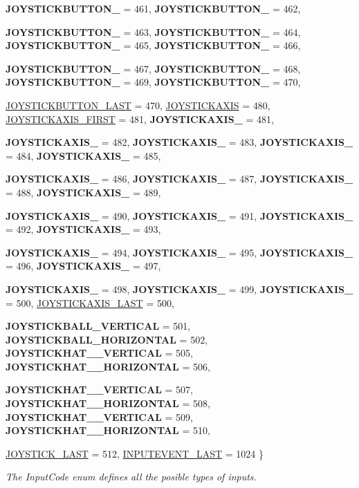\begin{DoxyCompactItemize}
{\bfseries JOYSTICKBUTTON\_} =  461, 
{\bfseries JOYSTICKBUTTON\_} =  462, 
\par
{\bfseries JOYSTICKBUTTON\_} =  463, 
{\bfseries JOYSTICKBUTTON\_} =  464, 
{\bfseries JOYSTICKBUTTON\_} =  465, 
{\bfseries JOYSTICKBUTTON\_} =  466, 
\par
{\bfseries JOYSTICKBUTTON\_} =  467, 
{\bfseries JOYSTICKBUTTON\_} =  468, 
{\bfseries JOYSTICKBUTTON\_} =  469, 
{\bfseries JOYSTICKBUTTON\_} =  470, 
\par
\hyperlink{classMezzanine_1_1MetaCode_a3b5633f0145bf3287cf53a3f05b5563ca7ea1e7f0467975d4d8165b3fd465c25d}{JOYSTICKBUTTON\_\-LAST} =  470, 
\hyperlink{classMezzanine_1_1MetaCode_a3b5633f0145bf3287cf53a3f05b5563ca01cf4d6112f9a220857513c6cfb8284e}{JOYSTICKAXIS} =  480, 
\hyperlink{classMezzanine_1_1MetaCode_a3b5633f0145bf3287cf53a3f05b5563ca5b234dac3606cc3158823d7162467efc}{JOYSTICKAXIS\_\-FIRST} =  481, 
{\bfseries JOYSTICKAXIS\_} =  481, 
\par
{\bfseries JOYSTICKAXIS\_} =  482, 
{\bfseries JOYSTICKAXIS\_} =  483, 
{\bfseries JOYSTICKAXIS\_} =  484, 
{\bfseries JOYSTICKAXIS\_} =  485, 
\par
{\bfseries JOYSTICKAXIS\_} =  486, 
{\bfseries JOYSTICKAXIS\_} =  487, 
{\bfseries JOYSTICKAXIS\_} =  488, 
{\bfseries JOYSTICKAXIS\_} =  489, 
\par
{\bfseries JOYSTICKAXIS\_} =  490, 
{\bfseries JOYSTICKAXIS\_} =  491, 
{\bfseries JOYSTICKAXIS\_} =  492, 
{\bfseries JOYSTICKAXIS\_} =  493, 
\par
{\bfseries JOYSTICKAXIS\_} =  494, 
{\bfseries JOYSTICKAXIS\_} =  495, 
{\bfseries JOYSTICKAXIS\_} =  496, 
{\bfseries JOYSTICKAXIS\_} =  497, 
\par
{\bfseries JOYSTICKAXIS\_} =  498, 
{\bfseries JOYSTICKAXIS\_} =  499, 
{\bfseries JOYSTICKAXIS\_} =  500, 
\hyperlink{classMezzanine_1_1MetaCode_a3b5633f0145bf3287cf53a3f05b5563cab40cf570d496830a4e8fa2caa45f5ea1}{JOYSTICKAXIS\_\-LAST} =  500, 
\par
{\bfseries JOYSTICKBALL\_\-VERTICAL} =  501, 
{\bfseries JOYSTICKBALL\_\-HORIZONTAL} =  502, 
{\bfseries JOYSTICKHAT\_\_\-VERTICAL} =  505, 
{\bfseries JOYSTICKHAT\_\_\-HORIZONTAL} =  506, 
\par
{\bfseries JOYSTICKHAT\_\_\-VERTICAL} =  507, 
{\bfseries JOYSTICKHAT\_\_\-HORIZONTAL} =  508, 
{\bfseries JOYSTICKHAT\_\_\-VERTICAL} =  509, 
{\bfseries JOYSTICKHAT\_\_\-HORIZONTAL} =  510, 
\par
\hyperlink{classMezzanine_1_1MetaCode_a3b5633f0145bf3287cf53a3f05b5563ca57cc1b6b463688d23f8b08a80d8a4353}{JOYSTICK\_\-LAST} =  512, 
\hyperlink{classMezzanine_1_1MetaCode_a3b5633f0145bf3287cf53a3f05b5563cabaac270b8aca6bcf32bf0f1e4d5158b9}{INPUTEVENT\_\-LAST} =  1024
 \}
\begin{DoxyCompactList}\small\item\em The InputCode enum defines all the posible types of inputs. \item\end{DoxyCompactList}\end{DoxyCompactItemize}

